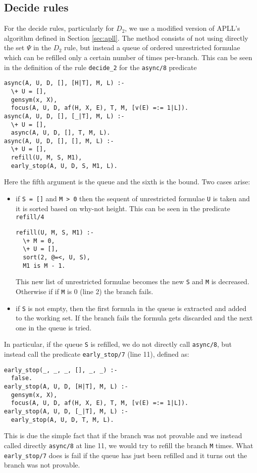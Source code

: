 \subsection{Decide rules}\label{sec:decide}
For the decide rules, particularly for $D_2$, we use a modified version of APLL's algorithm defined in Section \ref{sec:apll}.
The method consists of not using directly the set $\Psi$ in the $D_2$ rule, but instead a queue of ordered unrestricted formulae which can be refilled only a certain number of times per-branch.
This can be seen in the definition of the rule \texttt{decide\_2} for the \texttt{async/8} predicate
\begin{verbatim}
async(A, U, D, [], [H|T], M, L) :-
  \+ U = [],
  gensym(x, X),
  focus(A, U, D, af(H, X, E), T, M, [v(E) =:= 1|L]).
async(A, U, D, [], [_|T], M, L) :-
  \+ U = [],
  async(A, U, D, [], T, M, L).
async(A, U, D, [], [], M, L) :-
  \+ U = [],
  refill(U, M, S, M1),
  early_stop(A, U, D, S, M1, L).
\end{verbatim}
Here the fifth argument is the queue and the sixth is the bound.
Two cases arise:
\begin{itemize}
	\item if \texttt{S = []} and \texttt{M > 0} then the sequent of unrestricted formulae \texttt{U} is taken and it is sorted based on why-not height.	%
		This can be seen in the predicate \texttt{refill/4}
		\begin{verbatim}
refill(U, M, S, M1) :-
  \+ M = 0,
  \+ U = [], 
  sort(2, @=<, U, S), 
  M1 is M - 1.
		\end{verbatim}
		This new list of unrestricted formulae becomes the new \texttt{S} and \texttt{M} is decreased.
		Otherwise if if \texttt{M} is 0 (line 2) the branch fails.
	\item if \texttt{S} is not empty, then the first formula in the queue is extracted and added to the working set.	%
		If the branch fails the formula gets discarded and the next one in the queue is tried.	%
\end{itemize}
In particular, if the queue \texttt{S} is refilled, we do not directly call \texttt{async/8}, but instead call the predicate \texttt{early\_stop/7} (line 11), defined as:
\begin{verbatim}
early_stop(_, _, _, [], _, _) :-
  false.
early_stop(A, U, D, [H|T], M, L) :-
  gensym(x, X),
  focus(A, U, D, af(H, X, E), T, M, [v(E) =:= 1|L]).
early_stop(A, U, D, [_|T], M, L) :-
  early_stop(A, U, D, T, M, L).
\end{verbatim}
This is due the simple fact that if the branch was not provable and we instead called directly \texttt{async/8} at line 11, we would try to refill the branch \texttt{M} times.
What \texttt{early\_stop/7} does is fail if the queue has just been refilled and it turns out the branch was not provable.

